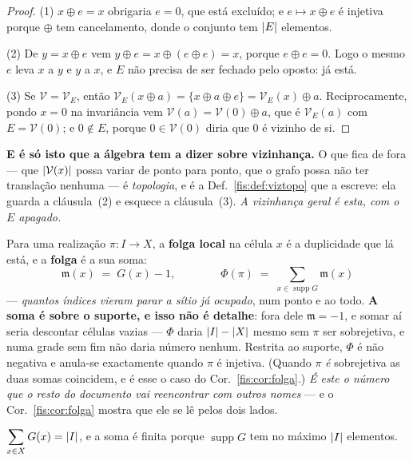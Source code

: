 \documentclass[livro.tex]{subfiles}
\begin{document}
\begin{proof}
(1) $x\oplus e=x$ obrigaria $e=0$, que está excluído; e $e\mapsto x\oplus e$ é
injetiva porque $\oplus$ tem cancelamento, donde o conjunto tem $\lvert E\rvert$
elementos.

(2) De $y=x\oplus e$ vem $y\oplus e=x\oplus(e\oplus e)=x$, porque
$e\oplus e=0$. Logo o mesmo $e$ leva $x$ a $y$ e $y$ a $x$, e $E$ não precisa de
ser fechado pelo oposto: já está.

(3) Se $\mathcal{V}=\mathcal{V}_E$, então
$\mathcal{V}_E(x\oplus a)=\{x\oplus a\oplus e\}=\mathcal{V}_E(x)\oplus a$.
Reciprocamente, pondo $x=0$ na invariância vem
$\mathcal{V}(a)=\mathcal{V}(0)\oplus a$, que é $\mathcal{V}_E(a)$ com
$E=\mathcal{V}(0)$; e $0\notin E$, porque $0\in\mathcal{V}(0)$ diria que $0$ é
vizinho de si.
\end{proof}

\medskip\noindent\textbf{E é só isto que a álgebra tem a dizer sobre vizinhança.}
O que fica de fora --- que $\lvert \mathcal{V}(x)\rvert$ possa variar de ponto para
ponto, que o grafo possa não ter translação nenhuma --- é \emph{topologia}, e é a
Def.~\ref{fis:def:viztopo} que a escreve: ela guarda a cláusula~(2) e esquece a
cláusula~(3). \emph{A vizinhança geral é esta, com o $E$ apagado.}

\begin{definicao}\label{fis:def:folga}
Para uma realização $\pi\colon I\to X$, a \textbf{folga local} na célula $x$ é a
duplicidade que lá está, e a \textbf{folga} é a sua soma:
\[
\boxed{\;\mathfrak{m}(x)\;=\;G(x)-1,
\qquad\qquad
\Phi(\pi)\;=\;\sum_{x\in\operatorname{supp}G}\mathfrak{m}(x)\;}
\]
--- \emph{quantos índices vieram parar a sítio já ocupado}, num ponto e ao todo.
\textbf{A soma é sobre o suporte, e isso não é detalhe}: fora dele
$\mathfrak{m}=-1$, e somar aí seria descontar células vazias --- $\Phi$ daria
$\lvert I\rvert-\lvert X\rvert$ mesmo sem $\pi$ ser sobrejetiva, e numa grade sem fim não daria
número nenhum. Restrita ao suporte, $\Phi$ é não negativa e anula-se exactamente
quando $\pi$ é injetiva. (Quando $\pi$ \emph{é} sobrejetiva as duas somas
coincidem, e é esse o caso do Cor.~\ref{fis:cor:folga}.) \emph{É este o número que o resto do documento vai reencontrar com
outros nomes} --- e o Cor.~\ref{fis:cor:folga} mostra que ele se lê pelos dois
lados.
\end{definicao}

\begin{lema}[conservação]\label{fis:lem:conserva}
$\displaystyle\sum_{x\in X}G(x)=\lvert I\rvert$, e a soma é finita porque
$\operatorname{supp}G$ tem no máximo $\lvert I\rvert$ elementos.
\end{lema}
\end{document}
